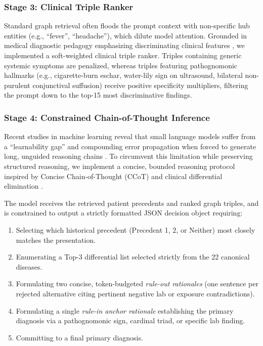 \documentclass{article}
\begin{document}
\subsubsection{Stage 3: Clinical Triple Ranker}

Standard graph retrieval often floods the prompt context with non-specific hub entities (e.g., ``fever'', ``headache''), which dilute model attention. Grounded in medical diagnostic pedagogy emphasizing discriminating clinical features \citep{bowen2006educational}, we implemented a soft-weighted clinical triple ranker. Triples containing generic systemic symptoms are penalized, whereas triples featuring pathognomonic hallmarks (e.g., cigarette-burn eschar, water-lily sign on ultrasound, bilateral non-purulent conjunctival suffusion) receive positive specificity multipliers, filtering the prompt down to the top-15 most discriminative findings.

\subsubsection{Stage 4: Constrained Chain-of-Thought Inference}

Recent studies in machine learning reveal that small language models suffer from a ``learnability gap'' and compounding error propagation when forced to generate long, unguided reasoning chains \citep{wei2022chain,fu2023specializing,li2025small}. To circumvent this limitation while preserving structured reasoning, we implement a concise, bounded reasoning protocol inspired by Concise Chain-of-Thought (CCoT) \citep{renze2024benefits} and clinical differential elimination \citep{bowen2006educational}.

The model receives the retrieved patient precedents and ranked graph triples, and is constrained to output a strictly formatted JSON decision object requiring:
\begin{enumerate}[noitemsep, topsep=2pt]
    \item Selecting which historical precedent (Precedent 1, 2, or Neither) most closely matches the presentation.
    \item Enumerating a Top-3 differential list selected strictly from the 22 canonical diseases.
    \item Formulating two concise, token-budgeted \emph{rule-out rationales} (one sentence per rejected alternative citing pertinent negative lab or exposure contradictions).
    \item Formulating a single \emph{rule-in anchor rationale} establishing the primary diagnosis via a pathognomonic sign, cardinal triad, or specific lab finding.
    \item Committing to a final primary diagnosis.
\end{enumerate}
\end{document}
